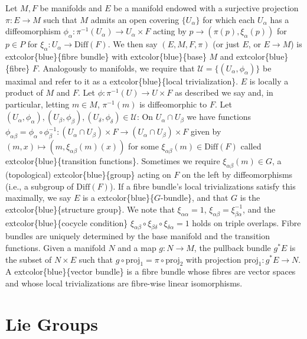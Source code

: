 \documentclass[
]{book}
\begin{document}
Let \(M, F\) be manifolds and \(E\) be a manifold endowed with a surjective projection \(\pi : E \to M\) such that \(M\) admits an open covering \(\{U_\alpha\}\) for which each \(U_\alpha\) has a diffeomorphism \(\phi_\alpha : \pi^{-1}(U_\alpha) \to U_\alpha \times F\) acting by \(p \to (\pi(p), \xi_\alpha(p))\) for \(p \in P\) for \(\xi_\alpha : U_\alpha \to \text{Diff}(F)\).
We then say \((E, M, F, \pi)\) (or just \(E\), or \(E \to M\)) is extcolor\{blue\}\{fibre bundle\} with extcolor\{blue\}\{base\} \(M\) and extcolor\{blue\}\{fibre\} \(F\).
Analogously to manifolds, we require that \(\mathcal{U} = \{(U_\alpha, \phi_\alpha)\}\) be maximal and refer to it as a extcolor\{blue\}\{local trivialization\}.
\(E\) is locally a product of \(M\) and \(F\). Let \(\phi : \pi^{-1}(U) \to U \times F\) as described we say and, in particular, letting \(m \in M\), \(\pi^{-1}(m)\) is diffeomorphic to \(F\).
Let \((U_\alpha, \phi_\alpha), (U_\beta, \phi_\beta), (U_\delta, \phi_\delta) \in \mathcal{U}\): On \(U_\alpha \cap U_\beta\) we have functions \(\phi_{\alpha\beta} = \phi_\alpha \circ \phi_\beta^{-1} : (U_\alpha \cap U_\beta) \times F \to (U_\alpha \cap U_\beta) \times F\) given by \((m, x) \mapsto (m, \xi_{\alpha\beta}(m)(x))\) for some \(\xi_{\alpha\beta}(m) \in \text{Diff}(F)\) called extcolor\{blue\}\{transition functions\}.
Sometimes we require \(\xi_{\alpha\beta}(m) \in G\), a (topological) extcolor\{blue\}\{group\} acting on \(F\) on the left by diffeomorphisms (i.e., a subgroup of \(\text{Diff}(F)\)).
If a fibre bundle's local trivializations satisfy this maximally, we say \(E\) is a extcolor\{blue\}\{\(G\)-bundle\}, and that \(G\) is the extcolor\{blue\}\{structure group\}.
We note that \(\xi_{\alpha\alpha} = 1\), \(\xi_{\alpha\beta} = \xi_{\beta\alpha}^{-1}\), and the extcolor\{blue\}\{cocycle condition\} \(\xi_{\alpha\beta} \circ \xi_{\beta\delta} \circ \xi_{\delta\alpha} = 1\) holds on triple overlaps.
Fibre bundles are uniquely determined by the base manifold and the transition functions. Given a manifold \(N\) and a map \(g : N \to M\), the pullback bundle \(g^*E\) is the subset of \(N \times E\) such that \(g \circ \text{proj}_{1} = \pi \circ \text{proj}_{2}\) with projection \(\text{proj}_{1} : g^*E \to N\).
A extcolor\{blue\}\{vector bundle\} is a fibre bundle whose fibres are vector spaces and whose local trivializations are fibre-wise linear isomorphisms.

\hypertarget{lie-groups}{%
\section{Lie Groups}\label{lie-groups}}
\end{document}
